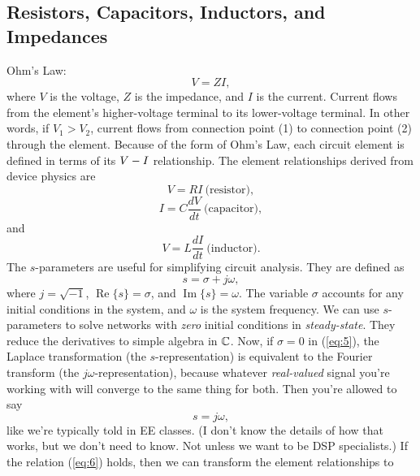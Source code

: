 \documentclass[12pt]{report}
\renewcommand\Re{\operatorname{Re}}
\renewcommand\Im{\operatorname{Im}}
\begin{document}
\subsection{Resistors, Capacitors, Inductors, and Impedances}
Ohm's Law:
\begin{equation}
\label{eq:1}
V = Z I,
\end{equation}
where $V$ is the voltage, $Z$ is the impedance, and $I$ is the current. Current flows from the element's higher-voltage terminal to its lower-voltage terminal. In other words, if $V_{1} > V_{2}$, current flows from connection point (1) to connection point (2) through the element.
Because of the form of Ohm's Law, each circuit element is defined in terms of its $V \-- I$ relationship. The element relationships derived from device physics are
\begin{equation}
\label{eq:2}
V = R I ~\text{(resistor)},
\end{equation}
\begin{equation}
\label{eq:3}
I = C \frac{dV}{dt} ~\text{(capacitor)},
\end{equation}
and
\begin{equation}
\label{eq:4}
V = L \frac{dI}{dt} ~\text{(inductor)}.
\end{equation}
The $s$-parameters are useful for simplifying circuit analysis. They are defined as
\begin{equation}
\label{eq:5}
s = \sigma + j \omega,
\end{equation}
where $j = \sqrt{-1}$, $\Re\{ s \} = \sigma$, and $\Im\{ s \} = \omega$. The variable $\sigma$ accounts for any initial conditions in the system, and $\omega$ is the system frequency. We can use $s$-parameters to solve networks with \textit{zero} initial conditions in \textit{steady-state}. They reduce the derivatives to simple algebra in $\mathbb{C}$. Now, if $\sigma = 0$ in (\ref{eq:5}), the Laplace transformation (the $s$-representation) is equivalent to the Fourier transform (the $j \omega$-representation), because whatever \textit{real-valued} signal you're working with will converge to the same thing for both. Then you're allowed to say
\begin{equation}
\label{eq:6}
s = j \omega,
\end{equation}
like we're typically told in EE classes. (I don't know the details of how that works, but we don't need to know. Not unless we want to be DSP specialists.)
If the relation (\ref{eq:6}) holds, then we can transform the element relationships to
\end{document}
